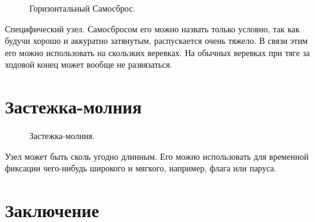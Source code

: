 \documentclass{artikel1}
\begin{document}
\begin{figure}[H]\centering
	\subfloat[Завязывание]{\label{ris:Arbor_fast_samosbros_1_1}
	\tcbox[enhanced jigsaw,colframe=black,opacityframe=0.5,opacityback=0.5,height=5cm]
		{\centering
			}
		}
\hfill
	\subfloat[Результат]{\label{ris:Arbor_fast_samosbros_1_2}
	\tcbox[enhanced jigsaw,colframe=black,opacityframe=0.5,opacityback=0.5,height=5cm]
		{\centering
			}
		}
\hfill
\hfill
	\caption{Горизонтальный Самосброс.}\label{ris:Arbor_fast_samosbros}
\end{figure}

Специфический узел. Самосбросом его можно назвать только условно, так как будучи хорошо и аккуратно затянутым, распускается очень тяжело. В связи этим его можно использовать на скользких веревках. На обычных веревках при тяге за ходовой конец может вообще не развязаться.

\section{Застежка-молния}

\begin{figure}[H]\centering
\setcounter{subfigure}{0}
\addtocounter{figure}{1}
	\begin{minipage}{1\linewidth}
		\begin{center}
			\tcbox[enhanced jigsaw,colframe=black,opacityframe=0.5,opacityback=0.5]
			{\centering{}}
		\end{center}
	\end{minipage}
\addtocounter{figure}{-1}
\caption{Застежка-молния.}
\label{ris:Latching}
\end{figure}

Узел может быть сколь угодно длинным. Его можно использовать для временной фиксации чего-нибудь широкого и мягкого, например, флага или паруса.

\section*{Заключение}
\end{document}
